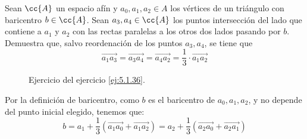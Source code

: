 \begin{ejercicio}\label{ej:5.1.36}
    Sean $\cc{A}$ un espacio afín y $a_0, a_1, a_2 \in A$ los vértices de un triángulo con baricentro $b \in \cc{A}$. Sean $a_3, a_4 \in \cc{A}$ los puntos intersección del lado que contiene a $a_1$ y $a_2$ con las rectas paralelas a los otros dos lados pasando por $b$. Demuestra que, salvo reordenación de los puntos $a_3, a_4$, se tiene que
    \begin{equation*}
        \vec{a_1a_3} = \vec{a_3a_4}= \vec{a_4a_2} = \frac{1}{3} \cdot \vec{a_1a_2}
    \end{equation*}

    \begin{figure}[H]
        \centering
        \caption{Ejercicio del ejercicio \ref{ej:5.1.36}.}      
    \end{figure}


    Por la definición de baricentro, como $b$ es el baricentro de $a_0,a_1,a_2$, y no depende del punto inicial elegido, tenemos que:
    \begin{equation*}
        b = a_1 + \frac{1}{3}\left(\vec{a_1a_0} + \vec{a_1a_2}\right)
        = a_2 + \frac{1}{3}\left(\vec{a_2a_0} + \vec{a_2a_1}\right)
    \end{equation*}


\end{ejercicio}
